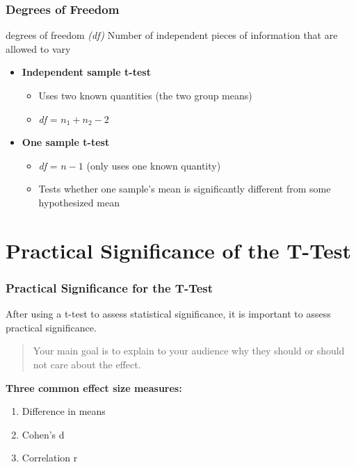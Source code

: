 \documentclass[12pt, block=fill]{beamer}
\begin{document}
\begin{frame}
  \frametitle{Degrees of Freedom}
  
  \begin{exampleblock}{degrees of freedom \textit{(df)}}
    Number of independent pieces of information that are allowed to vary
  \end{exampleblock}
  
  \begin{itemize}
    \item \textbf{Independent sample t-test}
    \begin{itemize}
      \item Uses two known quantities (the two group means)
      \item \textit{df} = $n_{1} + n_{2} -2$
    \end{itemize}
    \item \textbf{One sample t-test}
    \begin{itemize}
      \item \textit{df} = $n - 1$ (only uses one known quantity)
      \item Tests whether one sample's mean is significantly different from some hypothesized mean
    \end{itemize}
  \end{itemize}

\end{frame}




\section{Practical Significance of the T-Test}
\begin{frame}
  \frametitle{Practical Significance for the T-Test}

  After using a t-test to assess statistical significance, it is
  important to assess practical significance. \\ \vspace{1em}

  \begin{quote}
    Your main goal is to explain to your audience
    why they should or should not care about the effect.
  \end{quote}

  \textbf{Three common effect size measures:}

  \begin{enumerate}
  \item Difference in means
  \item Cohen's d
  \item Correlation r
  \end{enumerate}
\end{frame}
\end{document}
